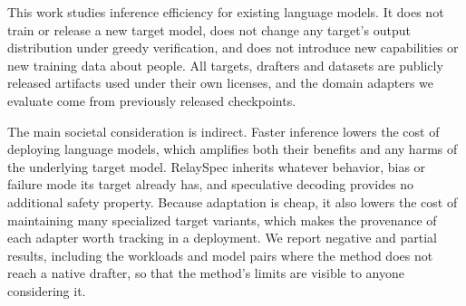 This work studies inference efficiency for existing language models. It does not train or release a new target model, does not change any target's output distribution under greedy verification, and does not introduce new capabilities or new training data about people. All targets, drafters and datasets are publicly released artifacts used under their own licenses, and the domain adapters we evaluate come from previously released checkpoints.

The main societal consideration is indirect. Faster inference lowers the cost of deploying language models, which amplifies both their benefits and any harms of the underlying target model. RelaySpec inherits whatever behavior, bias or failure mode its target already has, and speculative decoding provides no additional safety property. Because adaptation is cheap, it also lowers the cost of maintaining many specialized target variants, which makes the provenance of each adapter worth tracking in a deployment. We report negative and partial results, including the workloads and model pairs where the method does not reach a native drafter, so that the method's limits are visible to anyone considering it.
